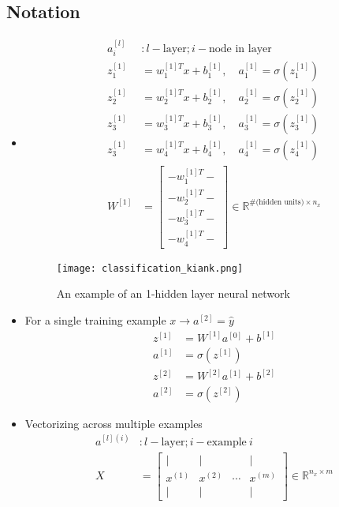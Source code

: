 \subsection{Notation}
\begin{itemize}
\item
    \begin{align*}
    a_i^{[l]} &: l - \text{layer}; i - \text{node in layer}\\
    z_1^{[1]} & = w_1^{[1]T}x + b_1^{[1]}, \quad a_1^{[1]} = \sigma(z_1^{[1]})\\
    z_2^{[1]} & = w_2^{[1]T}x + b_2^{[1]}, \quad a_2^{[1]} = \sigma(z_2^{[1]})\\
    z_3^{[1]} & = w_3^{[1]T}x + b_3^{[1]}, \quad a_3^{[1]} = \sigma(z_3^{[1]})\\
    z_3^{[1]} & = w_4^{[1]T}x + b_4^{[1]}, \quad a_4^{[1]} = \sigma(z_4^{[1]})\\
    W^{[1]} & = \left[\begin{array}{c} - w_1^{[1]T} -  \\ - w_2^{[1]T} -  \\ - w_3^{[1]T} -  \\ - w_4^{[1]T} - \end{array}\right] \in \mathbb{R}^{\#\text{(hidden units)} \times n_x}
    \end{align*}
    \begin{figure}[h]
    \centering
    \texttt{[image: classification\_kiank.png]}
    \caption{An example of an 1-hidden layer neural network}
    \label{fig:classification}
    \end{figure}
\item
For a single training example $x \rightarrow a^{[2]} = \hat{y}$
    \begin{align*}
    z^{[1]} & = W^{[1]}a^{[0]} + b^{[1]}\\
    a^{[1]} &= \sigma(z^{[1]})\\   
    z^{[2]} & = W^{[2]}a^{[1]} + b^{[2]}\\
    a^{[2]} &= \sigma(z^{[2]})
    \end{align*}
\item
Vectorizing across multiple examples
    \begin{align*}
    a^{[l](i)} &: l - \text{layer}; i - \text{example} \ i\\
    X & = \begin{bmatrix} |&|& &| \\ x^{(1)} & x^{(2)} & \cdots & x^{(m)} \\ |&|& &| \end{bmatrix} \in \mathbb{R}^{n_x \times m}\\

\end{align*}
\end{itemize}
